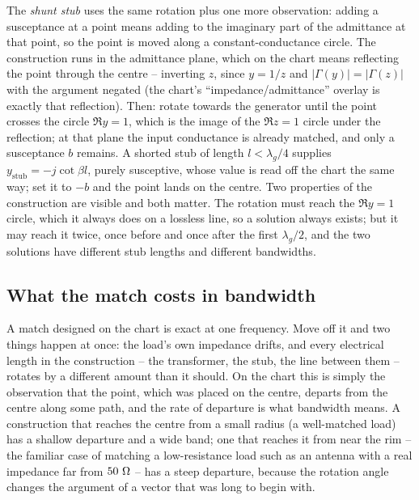 The \emph{shunt stub} uses the same rotation plus one more observation: adding a susceptance at a point means
adding to the imaginary part of the admittance at that point, so the point is moved along a constant-conductance
circle. The construction runs in the admittance plane, which on the chart means reflecting the point through the
centre -- inverting $z$, since $y=1/z$ and $|\Gamma(y)|=|\Gamma(z)|$ with the argument negated (the chart's
``impedance/admittance'' overlay is exactly that reflection). Then: rotate towards the generator until the point
crosses the circle $\Re y=1$, which is the image of the $\Re z=1$ circle under the reflection; at that plane the
input conductance is already matched, and only a susceptance $b$ remains. A shorted stub of length $l<\lambda_g/4$
supplies $y_{\mathrm{stub}}=-j\cot\beta l$, purely susceptive, whose value is read off the chart the same way; set
it to $-b$ and the point lands on the centre. Two properties of the construction are visible and both matter. The
rotation must reach the $\Re y=1$ circle, which it always does on a lossless line, so a solution always exists;
but it may reach it twice, once before and once after the first $\lambda_g/2$, and the two solutions have
different stub lengths and different bandwidths.

\subsection{What the match costs in bandwidth}
\label{sec:smith-bandwidth}

A match designed on the chart is exact at one frequency. Move off it and two things happen at once: the load's
own impedance drifts, and every electrical length in the construction -- the transformer, the stub, the line
between them -- rotates by a different amount than it should. On the chart this is simply the observation that
the point, which was placed on the centre, departs from the centre along some path, and the rate of departure is
what bandwidth means. A construction that reaches the centre from a small radius (a well-matched load) has a
shallow departure and a wide band; one that reaches it from near the rim -- the familiar case of matching a
low-resistance load such as an antenna with a real impedance far from $50\ \Omega$ -- has a steep departure, because
the rotation angle changes the argument of a vector that was long to begin with.


